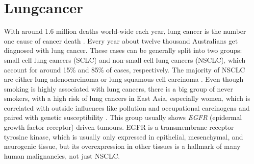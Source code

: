 \section{Lungcancer}
\label{intro-sec:lungcancer}

With around 1.6 million deaths world-wide each year, lung cancer is the number one cause of cancer death \cite{Siegel2018}. Every year about twelve thousand Australians get diagnosed with lung cancer. These cases can be generally split into two groups: small cell lung cancers (SCLC) and non-small cell lung cancers (NSCLC), which account for around 15\% and 85\% of cases, respectively. The majority of NSCLC are either lung adenocarcinoma or lung squamous cell carcinoma \cite{Molina2008}. Even though smoking is highly associated with lung cancers, there is a big group of never smokers, with a high risk of lung cancers in East Asia, especially women, which is correlated with outside influences like pollution and occupational carcinogens and paired with genetic susceptibility \cite{Sun2007}.
This group usually shows \textit{EGFR} (epidermal growth factor receptor) driven tumours. EGFR is a transmembrane receptor tyrosine kinase, which is usually only expressed in epithelial, mesenchymal, and neurogenic tissue, but its overexpression in other tissues is a hallmark of many human malignancies, not just NSCLC.

